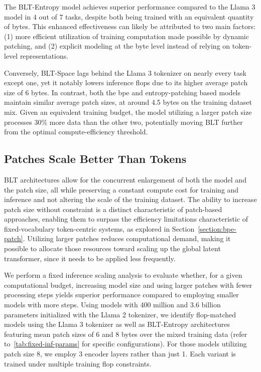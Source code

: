 The {\textsc BLT}-Entropy model achieves superior performance compared to the Llama 3 model in 4 out of 7 tasks, despite both being trained with an equivalent quantity of bytes. This enhanced effectiveness can likely be attributed to two main factors: (1) more efficient utilization of training computation made possible by dynamic patching, and (2) explicit modeling at the byte level instead of relying on token-level representations.

Conversely, {\textsc BLT}-Space lags behind the Llama 3 tokenizer on nearly every task except one, yet it notably lowers inference flops due to its higher average patch size of 6 bytes. In contrast, both the bpe and entropy-patching based models maintain similar average patch sizes, at around 4.5 bytes on the training dataset mix. Given an equivalent training budget, the model utilizing a larger patch size processes 30\% more data than the other two, potentially moving {\textsc BLT} further from the optimal compute-efficiency threshold.

\subsection{Patches Scale Better Than Tokens} {\textsc BLT} architectures allow for the concurrent enlargement of both the model and the patch size, all while preserving a constant compute cost for training and inference and not altering the scale of the training dataset. The ability to increase patch size without constraint is a distinct characteristic of patch-based approaches, enabling them to surpass the efficiency limitations characteristic of fixed-vocabulary token-centric systems, as explored in Section~\ref{section:bpe-patch}. Utilizing larger patches reduces computational demand, making it possible to allocate those resources toward scaling up the global latent transformer, since it needs to be applied less frequently.

We perform a fixed inference scaling analysis to evaluate whether, for a given computational budget, increasing model size and using larger patches with fewer processing steps yields superior performance compared to employing smaller models with more steps. Using models with 400 million and 3.6 billion parameters initialized with the Llama 2 tokenizer, we identify flop-matched models using the Llama 3 tokenizer as well as {\textsc BLT}-Entropy architectures featuring mean patch sizes of 6 and 8 bytes over the mixed training data (refer to~\autoref{tab:fixed-inf-params} for specific configurations). For those models utilizing patch size 8, we employ 3 encoder layers rather than just 1. Each variant is trained under multiple training flop constraints.

